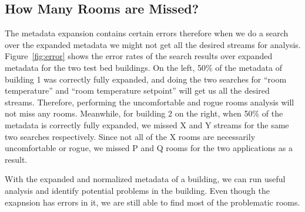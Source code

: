 
\subsection{How Many Rooms are Missed?}
The metadata expansion contains certain errors therefore when we do a search over the expanded metadata we might not get all the desired streams for analysis. Figure~\ref{fig:error} shows the error rates of the search results over expanded metadata for the two test bed buildings. On the left, 50\% of the metadata of building 1 was correctly fully expanded, and doing the two searches for ``room temperature'' and ``room temperature setpoint'' will get us all the desired streams. Therefore, performing the uncomfortable and rogue rooms analysis will not miss any rooms. Meanwhile, for building 2 on the right, when 50\% of the metadata is correctly fully expanded, we missed X and Y streams for the same two searches respectively. Since not all of the X rooms are necessarily uncomfortable or rogue, we missed P and Q rooms for the two applications as a result.

With the expanded and normalized metadata of a building, we can run useful analysis and identify potential problems in the building. Even though the exapnsion has errors in it, we are still able to find most of the problematic rooms.

